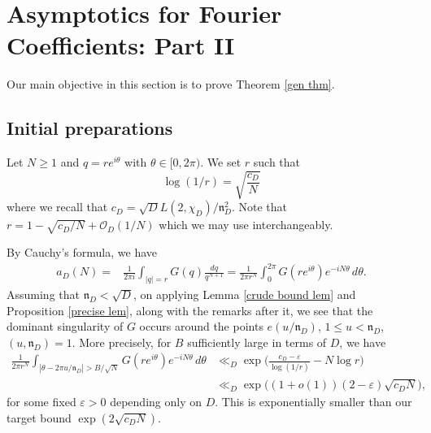 \documentclass[11pt]{amsart}
\numberwithin{equation}{section}
\newcommand{\mf}{\mathfrak}
\theoremstyle{remark}
\begin{document}
\section{Asymptotics for Fourier Coefficients: Part II} \label{Sec: Main Theorem Proof II}
Our main objective in this section is to prove Theorem \ref{gen thm}.
\subsection{Initial preparations}
Let $N \geq 1$ and $q=re^{i\theta}$ with $\theta\in[0,2\pi)$. We set $r$ such that 
\[
\log(1/r)=\sqrt{\frac{c_D}{N}}
\]  
where we recall that $c_D=\sqrt{D}L(2,\chi_D)/\mf{n}_D^2$.
Note that $r=1-\sqrt{{c_D}/{{N}}}+\mathcal{O}_D(1/N)$ which we may use interchangeably. 

By Cauchy's formula, we have 
\begin{align*}
a_D(N)
= &
\frac{1}{2\pi i }\int_{|q|=r} G(q)\frac{dq}{q^{N+1}}
=
\frac{1}{2\pi r^N}\int_0^{2\pi}G(re^{i\theta})e^{-iN\theta}\, d\theta.
\end{align*}
Assuming that $\mf{n}_D<\sqrt{D}$, on applying Lemma \ref{crude bound lem} and Proposition \ref{precise lem}, along with the remarks after it, we see that the dominant singularity of $G$ occurs around the points $e(u/\mf{n}_D)$, $1\leq u<\mf{n}_D$, $(u,\mf{n}_D)=1$. More precisely, for $B$ sufficiently large in terms of $D$, we have
\begin{align*}
\frac{1}{2\pi r^N}\int_{|\theta-2\pi u/\mf{n}_D|>B/\sqrt{N}}G(re^{i\theta})e^{-iN\theta} \, d\theta
&\ll_D
 \exp\bigg(\frac{c_D-\varepsilon}{\log(1/r)}-N\log r\bigg)
 \\
&\ll_D \exp\bigg((1+o(1))(2-\varepsilon){ \sqrt{c_DN}}\bigg),
\end{align*}
for some fixed $\varepsilon>0$ depending only on $D$. This is exponentially smaller than our target bound $\exp(2\sqrt{c_DN})$.
 
\end{document}
